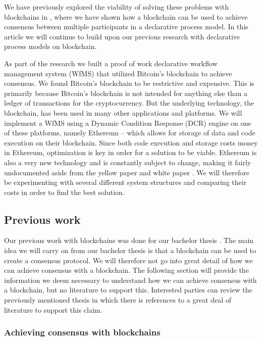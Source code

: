 \documentclass{article}
\begin{document}
	We have previously explored the viability of solving these problems with blockchains in \cite{bachelor}, where we have shown how a blockchain can be used to achieve consensus between multiple participants in a declarative process model. 
	In this article we will continue to build upon our previous research with declarative process models on blockchain.

	As part of the research we built a proof of work declarative workflow management system (WfMS) that utilized Bitcoin's blockchain to achieve consensus. 
	We found Bitcoin's blockchain to be restrictive and expensive.
	This is primarily because Bitcoin's blockchain is not intended for anything else than a ledger of transactions for the cryptocurrency. 
	But the underlying technology, the blockchain, has been used in many other applications and platforms. 
	We will implement a WfMS using a Dynamic Condition Response (DCR) engine on one of these platforms, namely Ethereum -- which allows for storage of data and code execution on their blockchain.
	Since both code execution and storage costs money in Ethereum, optimization is key in order for a solution to be viable.
	Ethereum is also a very new technology and is constantly subject to change, making it fairly undocumented aside from the yellow paper \cite{yellow-paper} and white paper \cite{ethereum-white-paper}.
	We will therefore be experimenting with several different system structures and comparing their costs in order to find the best solution.

		\subsection{Previous work}
		Our previous work with blockchains was done for our bachelor thesis \cite{bachelor}. 
		The main idea we will carry on from our bachelor thesis is that a blockchain can be used to create a consensus protocol. 
		We will therefore not go into great detail of how we can achieve consensus with a blockchain. 
		The following section will provide the information we deem necessary to understand how we can achieve consensus with a blockchain, but no literature to support this. 
		Interested parties can review the previously mentioned thesis in which there is references to a great deal of literature to support this claim.

			\subsubsection{Achieving consensus with blockchains}
\end{document}
